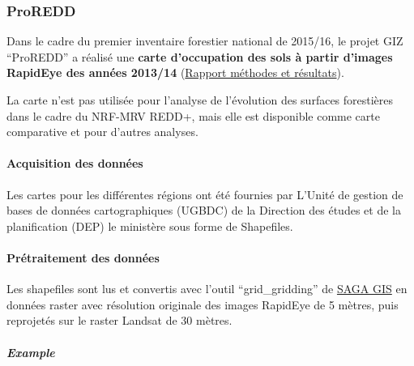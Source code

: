 \documentclass[a4paper, notitlepage, 12pt, krantz2]{krantz}
\let\oldparagraph\paragraph
\renewcommand{\paragraph}[1]{\oldparagraph{#1}\mbox{}}
\let\oldsubparagraph\subparagraph
\renewcommand{\subparagraph}[1]{\oldsubparagraph{#1}\mbox{}}
\begin{document}
\hypertarget{proredd}{%
\subsubsection{ProREDD}\label{proredd}}

Dans le cadre du premier inventaire forestier national de 2015/16, le projet GIZ ``ProREDD'' a réalisé une \textbf{carte d'occupation des sols à partir d'images RapidEye des années 2013/14} (\href{../01_SSTS/01_data/ProREDD/docs/Carte-RapidEye_final-report_2016.pdf}{Rapport méthodes et résultats}).

La carte n'est pas utilisée pour l'analyse de l'évolution des surfaces forestières dans le cadre du NRF-MRV REDD+, mais elle est disponible comme carte comparative et pour d'autres analyses.

\hypertarget{acquisition-des-donnees-3}{%
\paragraph{Acquisition des données}\label{acquisition-des-donnees-3}}

Les cartes pour les différentes régions ont été fournies par L'Unité de gestion de bases de données cartographiques (UGBDC) de la Direction des études et de la planification (DEP) le ministère sous forme de Shapefiles.

\hypertarget{pretraitement-des-donnees-3}{%
\paragraph{Prétraitement des données}\label{pretraitement-des-donnees-3}}

Les shapefiles sont lus et convertis avec l'outil ``grid\_gridding'' de \href{http://www.saga-gis.org/en/index.html}{SAGA GIS} en données raster avec résolution originale des images RapidEye de 5 mètres, puis reprojetés sur le raster Landsat de 30 mètres.

\hypertarget{example-3}{%
\subparagraph{Example}\label{example-3}}
\end{document}
